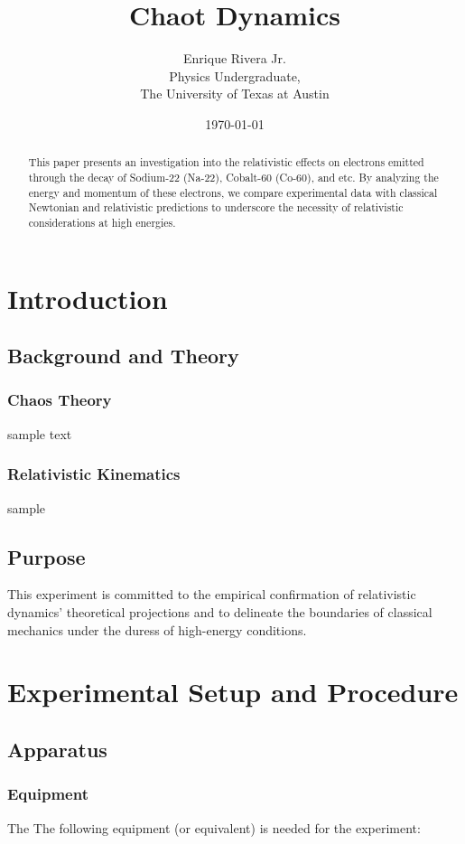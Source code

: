 \documentclass[12pt]{article}
\title{Chaot Dynamics}
\author{Enrique Rivera Jr. \\
        Physics Undergraduate, \\ 
        The University of Texas at Austin}
\date{\today}
\begin{document}
\maketitle

\begin{abstract}
        This paper presents an investigation into the relativistic effects on electrons emitted through 
        the decay of Sodium-22 (Na-22), Cobalt-60 (Co-60), and etc. By analyzing the energy and momentum of these electrons, 
        we compare experimental data with classical Newtonian and relativistic predictions to underscore 
        the necessity of relativistic considerations at high energies.
\end{abstract}

\section{Introduction}
    \subsection{Background and Theory}

        \subsubsection{Chaos Theory} 
        sample text 
        \subsubsection{Relativistic Kinematics}
        sample 

    \subsection{Purpose}
            This experiment is committed to the empirical confirmation of relativistic dynamics' theoretical projections and to delineate the boundaries of classical mechanics under the duress of high-energy conditions.


\section{Experimental Setup and Procedure}
        \subsection{Apparatus}
                \subsubsection{Equipment}
                The The following equipment (or equivalent) is needed for the experiment:
\end{document}
